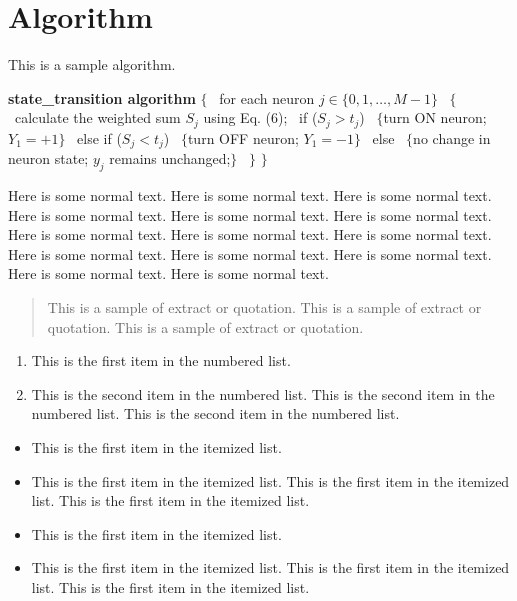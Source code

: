 \documentclass{wileySix}
\begin{document}
\section{Algorithm}
This is a sample algorithm.

\begin{algorithm}
{\bf state\_transition algorithm} $\{$
\        for each neuron $j\in\{0,1,\ldots,M-1\}$
\        $\{$
\            calculate the weighted sum $S_j$ using Eq. (6);
\            if ($S_j>t_j$)
\                    $\{$turn ON neuron; $Y_1=+1\}$
\            else if ($S_j<t_j$)
\                    $\{$turn OFF neuron; $Y_1=-1\}$
\            else
\                    $\{$no change in neuron state; $y_j$ remains %
unchanged;$\}$
\        $\}$
$\}$
\end{algorithm}

Here is some normal text.
Here is some normal text.
Here is some normal text.
Here is some normal text.
Here is some normal text.
Here is some normal text.
Here is some normal text.
Here is some normal text.
Here is some normal text.
Here is some normal text.
Here is some normal text.
Here is some normal text.
Here is some normal text.
Here is some normal text.


\begin{quote}
This is a sample of extract or quotation.
This is a sample of extract or quotation.
This is a sample of extract or quotation.
\end{quote}

\begin{enumerate}
\item
This is the first item in the numbered list.

\item
This is the second item in the numbered list.
This is the second item in the numbered list.
This is the second item in the numbered list.
\end{enumerate}

\begin{itemize}
\item
This is the first item in the itemized list.

\item
This is the first item in the itemized list.
This is the first item in the itemized list.
This is the first item in the itemized list.
\end{itemize}

\begin{itemize}
\item[]
This is the first item in the itemized list.

\item[]
This is the first item in the itemized list.
This is the first item in the itemized list.
This is the first item in the itemized list.
\end{itemize}
\end{document}
